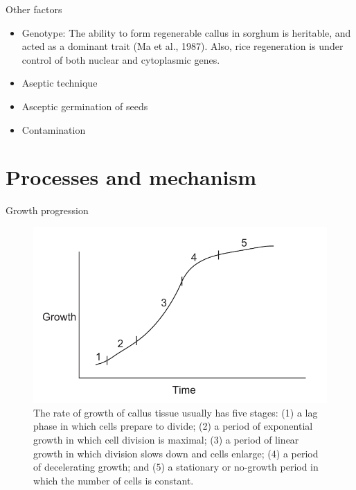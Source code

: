 \documentclass[ignorenonframetext,aspectratio=169]{beamer}
\providecommand{\tightlist}{%
  \setlength{\itemsep}{0pt}\setlength{\parskip}{0pt}}
\begin{document}
\begin{frame}{Other factors}
\protect\hypertarget{other-factors}{}

\begin{itemize}
\tightlist
\item
  Genotype: The ability to form regenerable callus in sorghum is
  heritable, and acted as a dominant trait (Ma et al., 1987). Also, rice
  regeneration is under control of both nuclear and cytoplasmic genes.
\item
  Aseptic technique
\item
  Asceptic germination of seeds
\item
  Contamination
\end{itemize}

\end{frame}

\hypertarget{processes-and-mechanism}{%
\section{Processes and mechanism}\label{processes-and-mechanism}}

\begin{frame}{Growth progression}
\protect\hypertarget{growth-progression}{}

\begin{figure}
\includegraphics[width=0.4\linewidth]{../images/growth_curve} \caption{The rate of growth of callus tissue usually has five stages: (1) a lag phase in which cells prepare to divide; (2) a period of exponential growth in which cell division is maximal; (3) a period of linear growth in which division slows down and cells enlarge; (4) a period of decelerating growth; and (5) a stationary or no-growth period in which the number of cells is constant.}\label{fig:growth-curves}
\end{figure}

\end{frame}
\end{document}
